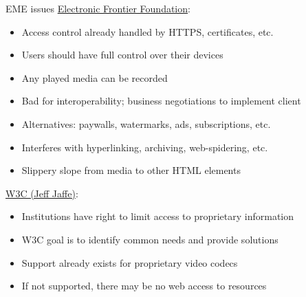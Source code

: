 \documentclass{beamer}
\begin{document}
\begin{frame}{EME issues}
\href{https://www.eff.org/deeplinks/2013/10/lowering-your-standards}{Electronic Frontier Foundation}:
\begin{itemize}
\item Access control already handled by HTTPS, certificates, etc.
\item Users should have full control over their devices
\item Any played media can be recorded
\item Bad for interoperability; business negotiations to implement client
\item Alternatives: paywalls, watermarks, ads, subscriptions, etc.
\item Interferes with hyperlinking, archiving, web-spidering, etc.
\item Slippery slope from media to other HTML elements
\end{itemize}
\href{http://www.w3.org/blog/2013/05/perspectives-on-encrypted-medi/}{W3C (Jeff Jaffe)}:
\begin{itemize}
\item Institutions have right to limit access to proprietary information
\item W3C goal is to identify common needs and provide solutions
\item Support already exists for proprietary video codecs
\item If not supported, there may be no web access to resources
\end{itemize}
\end{frame}
\end{document}
